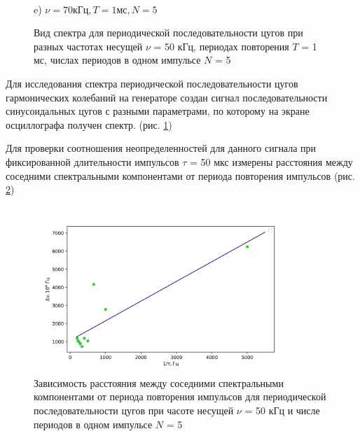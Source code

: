 \documentclass[a4paper,12pt]{article} %
\begin{document}
\begin{figure}[h!]
\begin{minipage}[h!]{0.47\linewidth}
 \\e) $\nu = 70 кГц, T = 1 мс, N = 5$
\end{minipage}
\caption{Вид спектра для периодической последовательности цугов при разных частотах несущей $\nu$ = 50 кГц, периодах повторения $T$ = 1 мс, числах
периодов в одном импульсе $N$ = 5}
\label{спектр_цуги}
\end{figure}
Для исследования спектра периодической последовательности цугов гармонических колебаний на генераторе создан сигнал последовательности синусоидальных цугов с разными параметрами, по которому на экране осциллографа получен спектр. (рис. \ref{спектр_цуги})

Для проверки соотношения неопределенностей для данного сигнала при фиксированной длительности импульсов $\tau$ = 50 мкс измерены расстояния между соседними спектральными компонентами от периода повторения импульсов (рис. \ref{dnu(T)_img})

\begin{figure}[h!]
\begin{center}
\includegraphics[width=0.9\textwidth]{T(dnu)}
\caption{Зависимость расстояния между соседними спектральными компонентами от периода повторения импульсов для периодической последовательности цугов при часоте несущей $\nu$ = 50 кГц и числе
периодов в одном импульсе $N$ = 5} \label{dnu(T)_img}
\end{center}
\end{figure}
\end{document}
